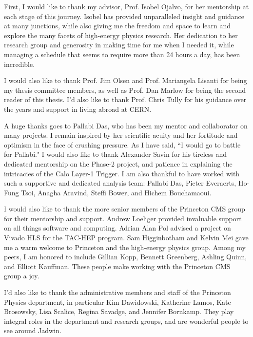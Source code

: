 

First, I would like to thank my advisor, Prof. Isobel Ojalvo, for her mentorship at each stage of this journey. Isobel has provided unparalleled insight and guidance at many junctions, while also giving me the freedom and space to learn and explore the many facets of high-energy physics research. Her dedication to her research group and generosity in making time for me when I needed it, while managing a schedule that seems to require more than 24 hours a day, has been incredible.

I would also like to thank Prof. Jim Olsen and Prof. Mariangela Lisanti for being my thesis committee members, as well as Prof. Dan Marlow for being the second reader of this thesis. I'd also like to thank Prof. Chris Tully for his guidance over the years and support in living abroad at CERN.

A huge thanks goes to Pallabi Das, who has been my mentor and collaborator on many projects. I remain inspired by her scientific acuity and her fortitude and optimism in the face of crushing pressure. As I have said, ``I would go to battle for Pallabi." I would also like to thank Alexander Savin for his tireless and dedicated mentorship on the Phase-2 project, and patience in explaining the intricacies of the Calo Layer-1 Trigger. I am also thankful to have worked with such a supportive and dedicated analysis team: Pallabi Das, Pieter Everaerts, Ho-Fung Tsoi, Anagha Aravind, Steffi Bower, and Hichem Bouchamaoui. 

I would also like to thank the more senior members of the Princeton CMS group for their mentorship and support. Andrew Loeliger provided invaluable support on all things software and computing. Adrian Alan Pol advised a project on Vivado HLS for the TAC-HEP program. Sam Higginbotham and Kelvin Mei gave me a warm welcome to Princeton and the high-energy physics group. Among my peers, I am honored to include Gillian Kopp, Bennett Greenberg, Ashling Quinn, and Elliott Kauffman. These people make working with the Princeton CMS group a joy.

I'd also like to thank the administrative members and staff of the Princeton Physics department, in particular Kim Dawidowski, Katherine Lamos, Kate Brosowsky,  Lisa Scalice, Regina Savadge, and Jennifer Bornkamp. They play integral roles in the department and research groups, and are wonderful people to see around Jadwin.

